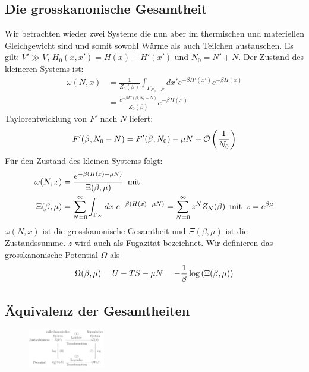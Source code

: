 \subsection{Die grosskanonische Gesamtheit}

Wir betrachten wieder zwei Systeme die nun aber im thermischen und materiellen
Gleichgewicht sind und somit sowohl Wärme als auch Teilchen austauschen. Es gilt:
$V' \gg V$, $H_0(x,x') = H(x) + H'(x')$ und $N_0 = N' + N$. Der Zustand des
kleineren Systems ist:
\begin{align*}
    \omega(N,x) &= \frac{1}{Z_0(\beta)} \int_{\Gamma_{N_0 - N}} dx' e^{-\beta H'(x')} e^{-\beta H(x)}
    \\
    &= \frac{e^{-\beta F'(\beta,N_0 -N)}}{Z_0(\beta)} e^{-\beta H(x)}
\end{align*}
Taylorentwicklung von $F'$ nach $N$ liefert:
\begin{align*}
    F'(\beta,N_0 - N) = F'(\beta,N_0) - \mu N + \mathcal{O} \left( \frac{1}{N_0} \right)
\end{align*}
Für den Zustand des kleinen Systems folgt:
\begin{align*}
    \omega(N,x) &= \frac{e^{-\beta \klammer{H(x) - \mu N}}}{\Xi (\beta,\mu)}
    \hspace{5pt} \text{mit} \\
    \Xi(\beta,\mu) &= \sum_{N=0}^\infty \int_{\Gamma_N} dx \ e^{-\beta(H(x)-\mu N)}
    = \sum_{N=0}^\infty z^N Z_N (\beta)
    \hspace{5pt} \text{mit} \hspace{5pt}
    z = e^{\beta \mu}
\end{align*}
$\omega(N,x)$ ist die grosskanonische Gesamtheit und $\Xi(\beta,\mu)$ ist
die Zustandssumme. $z$ wird auch als Fugazität bezeichnet. Wir definieren
das grosskanonische Potential $\Omega$ als
\begin{align*}
    \Omega(\beta,\mu) = U - T S - \mu N
    = - \frac{1}{\beta} \log \left( \Xi(\beta,\mu) \right)
\end{align*}

\subsection{Äquivalenz der Gesamtheiten}

\begin{figure}[H]
    \centering
    \includegraphics[width=0.3\textwidth]{Bilder/Aequivalenz_der_Gesamtheiten.png}
\end{figure}

